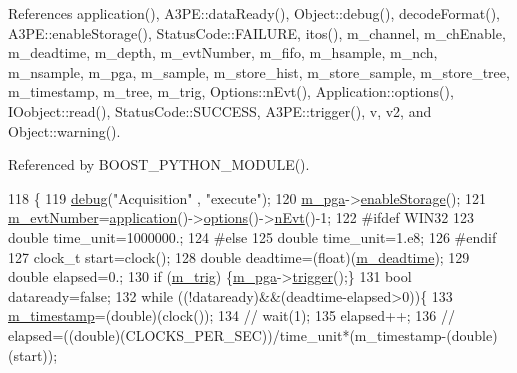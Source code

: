 References application(), A3\+P\+E\+::data\+Ready(), Object\+::debug(), decode\+Format(), A3\+P\+E\+::enable\+Storage(), Status\+Code\+::\+F\+A\+I\+L\+U\+RE, itos(), m\+\_\+channel, m\+\_\+ch\+Enable, m\+\_\+deadtime, m\+\_\+depth, m\+\_\+evt\+Number, m\+\_\+fifo, m\+\_\+hsample, m\+\_\+nch, m\+\_\+nsample, m\+\_\+pga, m\+\_\+sample, m\+\_\+store\+\_\+hist, m\+\_\+store\+\_\+sample, m\+\_\+store\+\_\+tree, m\+\_\+timestamp, m\+\_\+tree, m\+\_\+trig, Options\+::n\+Evt(), Application\+::options(), I\+Oobject\+::read(), Status\+Code\+::\+S\+U\+C\+C\+E\+SS, A3\+P\+E\+::trigger(), v, v2, and Object\+::warning().



Referenced by B\+O\+O\+S\+T\+\_\+\+P\+Y\+T\+H\+O\+N\+\_\+\+M\+O\+D\+U\+L\+E().


\begin{DoxyCode}
118                                   \{
119   \hyperlink{classObject_aac010553f022165573714b7014a15f0d}{debug}(\textcolor{stringliteral}{"Acquisition"} , \textcolor{stringliteral}{"execute"});
120   \hyperlink{classAcquisition_aac113fd42c6574cdb4154e9808a21b67}{m\_pga}->\hyperlink{classA3PE_a2071d7922f140ee6705da954efb685f7}{enableStorage}();
121   \hyperlink{classAcquisition_a32a70daa3f653eae5eafc46dbd0e11a6}{m\_evtNumber}=\hyperlink{Tools_8h_a27885a3c35afe79029fb830f32f66458}{application}()->\hyperlink{classApplication_ada7cc0e8db586985f1435aee0c79f47d}{options}()->\hyperlink{classOptions_ad769b256263a4ac24dd6f989ae724ab7}{nEvt}()-1;
122 \textcolor{preprocessor}{#ifdef WIN32}
123     \textcolor{keywordtype}{double} time\_unit=1000000.;
124 \textcolor{preprocessor}{#else}
125     \textcolor{keywordtype}{double} time\_unit=1.e8;
126 \textcolor{preprocessor}{#endif}
127   clock\_t start=clock();
128   \textcolor{keywordtype}{double} deadtime=(float)(\hyperlink{classAcquisition_a5f7fe20506e7d860ed61935255adfe17}{m\_deadtime});
129   \textcolor{keywordtype}{double} elapsed=0.;
130   \textcolor{keywordflow}{if} (\hyperlink{classAcquisition_a953bdc1bf56206b6df33b648af32a24f}{m\_trig}) \{\hyperlink{classAcquisition_aac113fd42c6574cdb4154e9808a21b67}{m\_pga}->\hyperlink{classA3PE_a75cd0377eb653ed22c4d258ab359f3d6}{trigger}();\}
131   \textcolor{keywordtype}{bool} dataready=\textcolor{keyword}{false};
132   \textcolor{keywordflow}{while} ((!dataready)&&(deadtime-elapsed>0))\{    
133       \hyperlink{classAcquisition_aa88cf8d27e075b5aaddb309dfb42cd04}{m\_timestamp}=(double)(clock());
134 \textcolor{comment}{//      wait(1);}
135       elapsed++;
136 \textcolor{comment}{//      elapsed=((double)(CLOCKS\_PER\_SEC))/time\_unit*(m\_timestamp-(double)(start));}

\end{DoxyCode}
